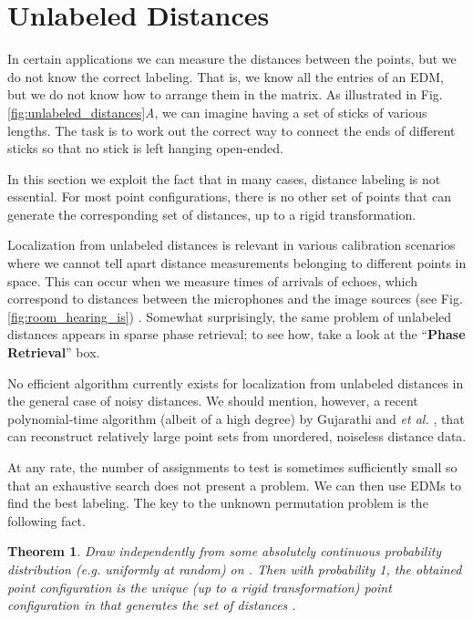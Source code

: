 \documentclass[10pt,double]{IEEEtran}
\newtheorem{thm}{Theorem}
\newcommand{\rev}[1]{{#1}}
\begin{document}
\section{Unlabeled Distances} \label{sec:unlabeled_distances}

In certain applications we can measure the distances between the points, but
we do not know the correct labeling. That is, we know all the entries of an
EDM, but we do not know how to arrange them in the matrix. As illustrated in
Fig. \ref{fig:unlabeled_distances}\textsl{A}, we can imagine having a set of
sticks of various lengths. The task is to work out the correct way to connect
the ends of different sticks so that no stick is left hanging open-ended.

In this section we exploit the fact that in many cases, distance labeling is
not essential. For most point configurations, there is no other set of points
that can generate the corresponding set of distances, up to a rigid
transformation.

Localization from unlabeled distances is relevant in various calibration
scenarios where we cannot tell apart distance measurements belonging to
different points in space. This can occur when we measure times of arrivals of
echoes, which correspond to distances between the microphones and the image
sources (see Fig. \ref{fig:room_hearing_is})
\cite{Dokmanic:2014tc, Dokmanic:2013dz}. Somewhat surprisingly, the same
problem of unlabeled distances appears in sparse phase retrieval; to see how,
take a look at the ``\textbf{Phase Retrieval}'' box.

No efficient algorithm currently exists for localization from unlabeled
distances in the general case of noisy distances. \rev{We should mention,
however, a recent polynomial-time algorithm (albeit of a high degree) by
Gujarathi and \emph{et al.} \cite{Gujarathi:2014cz}, that can reconstruct
relatively large point sets from unordered, noiseless distance data.}

At any rate, the number of assignments to test is sometimes sufficiently small
so that an exhaustive search does not present a problem. We can then use EDMs
to find the best labeling. The key to the unknown permutation problem is the
following fact.

\begin{thm}
	\label{thm:unlabeled}
  Draw  independently from some
  absolutely continuous probability distribution (\emph{e.g.} uniformly at
  random) on . Then with probability 1, the obtained
  point configuration is the unique \rev{(up to a rigid transformation)} point
  configuration in  that generates the set of distances
  .
\end{thm}
\end{document}

